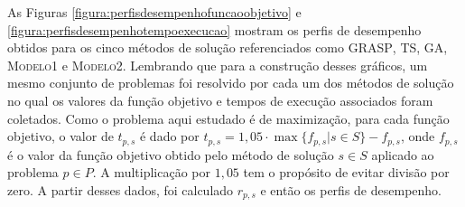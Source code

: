 \documentclass{MO824}
\begin{document}
\begin{table}[H]
\caption{Resultados obtidos para cada método de solução.}
\label{tabela:perfisdesempenho}
\end{table}

As Figuras \ref{figura:perfisdesempenhofuncaoobjetivo} e \ref{figura:perfisdesempenhotempoexecucao} mostram os perfis de desempenho obtidos para os cinco métodos de solução referenciados como \textsc{GRASP}, \textsc{TS}, \textsc{GA}, \textsc{Modelo1} e \textsc{Modelo2}. Lembrando que para a construção desses gráficos, um mesmo conjunto de problemas foi resolvido por cada um dos métodos de solução no qual os valores da função objetivo e tempos de execução associados foram coletados. Como o problema aqui estudado é de maximização, para cada função objetivo, o valor de $t_{p,s}$ é dado por $t_{p,s} = 1,05 \cdot \max\{f_{p,s} \vert s \in S\} - f_{p, s}$, onde $f_{p,s}$ é o valor da função objetivo obtido pelo método de solução $s \in S$ aplicado ao problema $p \in P$. A multiplicação por $1,05$ tem o propósito de evitar divisão por zero. A partir desses dados, foi calculado $r_{p,s}$ e então os perfis de desempenho.
\end{document}
